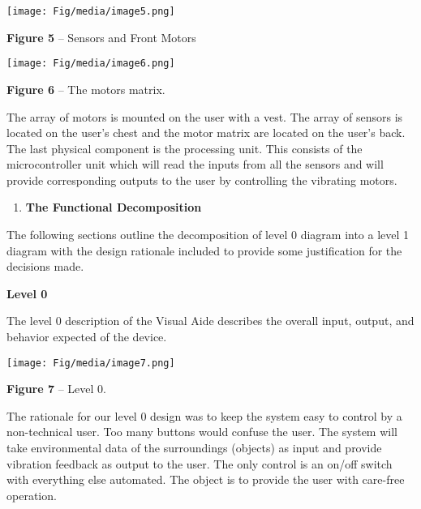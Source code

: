 \texttt{[image: Fig/media/image5.png]}

\textbf{Figure 5} -- Sensors and Front Motors

\texttt{[image: Fig/media/image6.png]}

\textbf{Figure 6} -- The motors matrix.

The array of motors is mounted on the user with a vest. The array of
sensors is located on the user's chest and the motor matrix are located
on the user's back. The last physical component is the processing unit.
This consists of the microcontroller unit which will read the inputs
from all the sensors and will provide corresponding outputs to the user
by controlling the vibrating motors.

\begin{enumerate}
\def\labelenumi{\arabic{enumi}.}
\item
  \textbf{The Functional Decomposition}
\end{enumerate}

The following sections outline the decomposition of level 0 diagram into
a level 1 diagram with the design rationale included to provide some
justification for the decisions made.

\textbf{Level 0}

The level 0 description of the Visual Aide describes the overall input,
output, and behavior expected of the device.

\texttt{[image: Fig/media/image7.png]}

\textbf{Figure 7} -- Level 0.

The rationale for our level 0 design was to keep the system easy to
control by a non-technical user. Too many buttons would confuse the
user. The system will take environmental data of the surroundings
(objects) as input and provide vibration feedback as output to the user.
The only control is an on/off switch with everything else automated. The
object is to provide the user with care-free operation.

